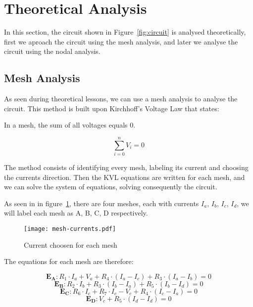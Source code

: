 \section{Theoretical Analysis}
\label{sec:analysis}

In this section, the circuit shown in Figure~\ref{fig:circuit} is analysed
theoretically, first we aproach the circuit using the mesh analysis, and later we analyse the circuit using the nodal analysis.

\subsection{Mesh Analysis}

As seen during theoretical lessons, we can use a mesh analysis to analyse the circuit.
This method is built upon Kirchhoff's Voltage Law that states:

In a mesh, the sum of all voltages equals 0.

\begin{equation}
  \sum_{i=0}^{n} V_i = 0
  \label{eq:kvl}
\end{equation}

The method consists of identifying every mesh, labeling its current and choosing the currents direction.
Then the KVL equations are written for each mesh, and we can solve the system of equations, solving consequently the circuit.

As seen in in figure~\ref{fig:mesh}, there are four meshes, each with currents $I_a$, $I_b$, $I_c$, $I_d$, 
we will label each mesh as A, B, C, D respectively.
\begin{figure}[h] \centering
  \texttt{[image: mesh-currents.pdf]}
  \caption{Current choosen for each mesh}
  \label{fig:mesh}
  \end{figure}

The equations for each mesh are therefore:

\begin{equation}
  \mathbf{E_A} : R_1 \cdot I_a + V_a + R_4 \cdot ( I_a -I_c )+ R_3 \cdot ( I_a - I_b ) = 0
  \label{eq:kvlA}
\end{equation}
\begin{equation}
  \mathbf{E_B} : R_2 \cdot I_b + R_3 \cdot ( I_b - I_a ) + R_5 \cdot ( I_b - I_d ) = 0
  \label{eq:kvlB}
\end{equation}
\begin{equation}
  \mathbf{E_C} : R_6 \cdot I_c + R_7 \cdot I_c - V_c +  R_4 \cdot ( I_c -I_a ) = 0
  \label{eq:kvlC}
\end{equation}
\begin{equation}
  \mathbf{E_D} : V_c + R_5 \cdot ( I_d - I_d )= 0
  \label{eq:kvlD}
\end{equation}


